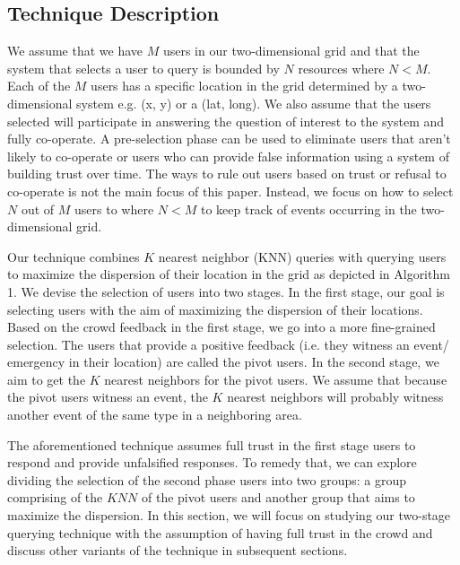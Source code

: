\documentclass{acm_proc_article-sp}
\begin{document}
\subsection{Technique Description}
We assume that we have $M$ users in our two-dimensional grid and that the system that selects a user to query is bounded by $N$ resources where $N < M$.  Each of the $M$ users has a specific location in the grid determined by a two-dimensional system e.g. (x, y) or a (lat, long). We also assume that the users selected will participate in answering the question of interest to the system and fully co-operate. A pre-selection phase can be used to eliminate users that aren't likely to co-operate or users who can provide false information using a system of building trust over time. The ways to rule out users based on trust or refusal to co-operate is not the main focus of this paper. Instead, we focus on how to select $N$ out of $M$ users to  where $N < M$ to keep track of events occurring in the two-dimensional grid.\par
Our technique combines $K$ nearest neighbor (KNN) queries with querying users to maximize the dispersion of their location in the grid as depicted in Algorithm 1. We devise the selection of users into two stages. In the first stage, our goal is selecting users with the aim of maximizing the dispersion of their locations. Based on the crowd feedback in the first stage, we go into a more fine-grained selection. The users that provide a positive feedback (i.e. they witness an event/ emergency in their location) are called the pivot users. In the second stage, we aim to get the $K$ nearest neighbors for the pivot users. We assume that because the pivot users witness an event, the $K$ nearest neighbors will probably witness another event of the same type in a neighboring area. \par
The aforementioned technique assumes full trust in the first stage users to respond and provide unfalsified responses. To remedy that, we can explore dividing the selection of the second phase users into two groups: a group comprising of the $KNN$ of the pivot users and another group that aims to maximize the dispersion. In this section, we will focus on studying our two-stage querying technique with the assumption of having full trust in the crowd and discuss other variants of the technique in subsequent sections.\par  
\end{document}
